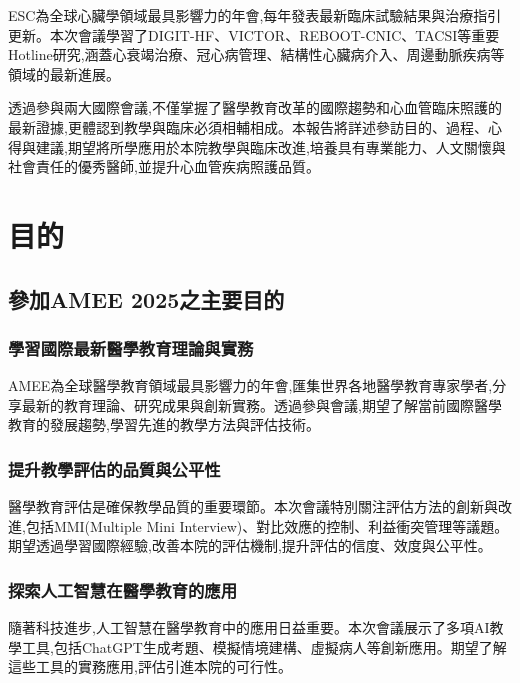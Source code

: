 \documentclass[12pt,a4paper]{article}
\begin{document}
ESC為全球心臟學領域最具影響力的年會,每年發表最新臨床試驗結果與治療指引更新。本次會議學習了DIGIT-HF、VICTOR、REBOOT-CNIC、TACSI等重要Hotline研究,涵蓋心衰竭治療、冠心病管理、結構性心臟病介入、周邊動脈疾病等領域的最新進展。

透過參與兩大國際會議,不僅掌握了醫學教育改革的國際趨勢和心血管臨床照護的最新證據,更體認到教學與臨床必須相輔相成。本報告將詳述參訪目的、過程、心得與建議,期望將所學應用於本院教學與臨床改進,培養具有專業能力、人文關懷與社會責任的優秀醫師,並提升心血管疾病照護品質。

\newpage
\tableofcontents
\newpage

\setcounter{page}{1}

\section{目的}

\subsection{參加AMEE 2025之主要目的}

\subsubsection{學習國際最新醫學教育理論與實務}

AMEE為全球醫學教育領域最具影響力的年會,匯集世界各地醫學教育專家學者,分享最新的教育理論、研究成果與創新實務。透過參與會議,期望了解當前國際醫學教育的發展趨勢,學習先進的教學方法與評估技術。

\subsubsection{提升教學評估的品質與公平性}

醫學教育評估是確保教學品質的重要環節。本次會議特別關注評估方法的創新與改進,包括MMI(Multiple Mini Interview)、對比效應的控制、利益衝突管理等議題。期望透過學習國際經驗,改善本院的評估機制,提升評估的信度、效度與公平性。

\subsubsection{探索人工智慧在醫學教育的應用}

隨著科技進步,人工智慧在醫學教育中的應用日益重要。本次會議展示了多項AI教學工具,包括ChatGPT生成考題、模擬情境建構、虛擬病人等創新應用。期望了解這些工具的實務應用,評估引進本院的可行性。
\end{document}
